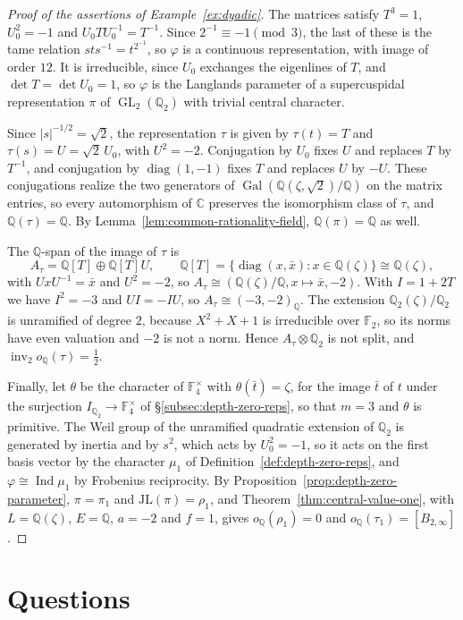 \documentclass[a4paper,11pt]{amsart}
\theoremstyle{definition}
\theoremstyle{remark}
\numberwithin{equation}{section}
\newcommand{\Q}{\mathbb{Q}}
\DeclareMathOperator{\inv}{inv}
\DeclareMathOperator{\Gal}{Gal}
\DeclareMathOperator{\GL}{GL}
\DeclareMathOperator{\diag}{diag}
\newcommand{\F}{\mathbb{F}}
\newcommand{\C}{\mathbb{C}}
\DeclareMathOperator{\Ind}{Ind}
\newcommand{\JL}{\mathrm{JL}}
\begin{document}
\begin{proof}[Proof of the assertions of Example~\ref{ex:dyadic}]
The matrices satisfy $T^3=1$, $U_0^2=-1$ and $U_0TU_0^{-1}=T^{-1}$. Since $2^{-1}\equiv-1\pmod 3$, the last of these is the tame relation $sts^{-1}=t^{2^{-1}}$, so $\varphi$ is a continuous representation, with image of order $12$. It is irreducible, since $U_0$ exchanges the eigenlines of $T$, and $\det T=\det U_0=1$, so $\varphi$ is the Langlands parameter of a supercuspidal representation $\pi$ of $\GL_2(\Q_2)$ with trivial central character.

Since $|s|^{-1/2}=\sqrt2$, the representation $\tau$ is given by $\tau(t)=T$ and $\tau(s)=U=\sqrt2\,U_0$, with $U^2=-2$. Conjugation by $U_0$ fixes $U$ and replaces $T$ by $T^{-1}$, and conjugation by $\diag(1,-1)$ fixes $T$ and replaces $U$ by $-U$. These conjugations realize the two generators of $\Gal(\Q(\zeta,\sqrt2)/\Q)$ on the matrix entries, so every automorphism of $\C$ preserves the isomorphism class of $\tau$, and $\Q(\tau)=\Q$. By Lemma~\ref{lem:common-rationality-field}, $\Q(\pi)=\Q$ as well.

The $\Q$-span of the image of $\tau$ is
\[
 A_\tau=\Q[T]\oplus\Q[T]U,\qquad \Q[T]=\{\diag(x,\bar x):x\in\Q(\zeta)\}\cong\Q(\zeta),
\]
with $UxU^{-1}=\bar x$ and $U^2=-2$, so $A_\tau\cong(\Q(\zeta)/\Q,x\mapsto\bar x,-2)$. With $I=1+2T$ we have $I^2=-3$ and $UI=-IU$, so $A_\tau\cong(-3,-2)_{\Q}$. The extension $\Q_2(\zeta)/\Q_2$ is unramified of degree $2$, because $X^2+X+1$ is irreducible over $\F_2$, so its norms have even valuation and $-2$ is not a norm. Hence $A_\tau\otimes\Q_2$ is not split, and $\inv_2o_{\Q}(\tau)=\frac12$.

Finally, let $\theta$ be the character of $\F_4^\times$ with $\theta(\bar t)=\zeta$, for the image $\bar t$ of $t$ under the surjection $I_{\Q_2}\to\F_4^\times$ of \S\ref{subsec:depth-zero-reps}, so that $m=3$ and $\theta$ is primitive. The Weil group of the unramified quadratic extension of $\Q_2$ is generated by inertia and by $s^2$, which acts by $U_0^2=-1$, so it acts on the first basis vector by the character $\mu_1$ of Definition~\ref{def:depth-zero-reps}, and $\varphi\cong\Ind\mu_1$ by Frobenius reciprocity. By Proposition~\ref{prop:depth-zero-parameter}, $\pi=\pi_1$ and $\JL(\pi)=\rho_1$, and Theorem~\ref{thm:central-value-one}, with $L=\Q(\zeta)$, $E=\Q$, $a=-2$ and $f=1$, gives $o_\Q(\rho_1)=0$ and $o_\Q(\tau_1)=[B_{2,\infty}]$.
\end{proof}

\section{Questions}\label{sec:questions}
\end{document}
